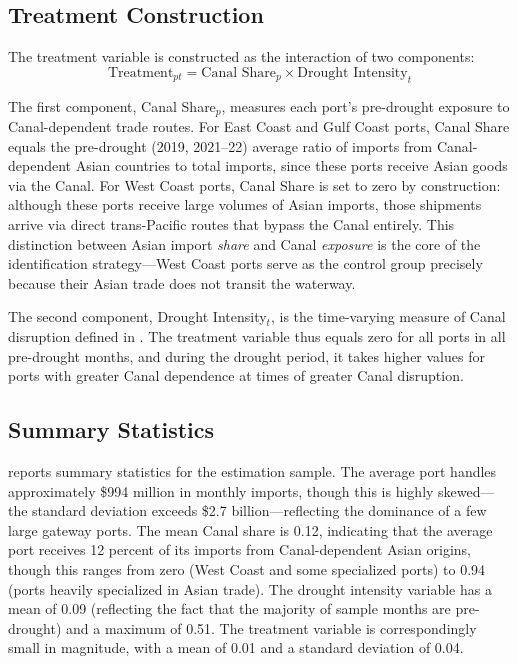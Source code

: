 \documentclass[12pt]{article}
\begin{document}
\subsection{Treatment Construction}

The treatment variable is constructed as the interaction of two components:
\begin{equation}
    \text{Treatment}_{pt} = \text{Canal Share}_p \times \text{Drought Intensity}_t
\label{eq:treatment}
\end{equation}

The first component, Canal Share$_p$, measures each port's pre-drought exposure to Canal-dependent trade routes. For East Coast and Gulf Coast ports, Canal Share equals the pre-drought (2019, 2021--22) average ratio of imports from Canal-dependent Asian countries to total imports, since these ports receive Asian goods via the Canal. For West Coast ports, Canal Share is set to zero by construction: although these ports receive large volumes of Asian imports, those shipments arrive via direct trans-Pacific routes that bypass the Canal entirely. This distinction between Asian import \textit{share} and Canal \textit{exposure} is the core of the identification strategy---West Coast ports serve as the control group precisely because their Asian trade does not transit the waterway.

The second component, Drought Intensity$_t$, is the time-varying measure of Canal disruption defined in . The treatment variable thus equals zero for all ports in all pre-drought months, and during the drought period, it takes higher values for ports with greater Canal dependence at times of greater Canal disruption.

\subsection{Summary Statistics}

 reports summary statistics for the estimation sample. The average port handles approximately \$994 million in monthly imports, though this is highly skewed---the standard deviation exceeds \$2.7 billion---reflecting the dominance of a few large gateway ports. The mean Canal share is 0.12, indicating that the average port receives 12 percent of its imports from Canal-dependent Asian origins, though this ranges from zero (West Coast and some specialized ports) to 0.94 (ports heavily specialized in Asian trade). The drought intensity variable has a mean of 0.09 (reflecting the fact that the majority of sample months are pre-drought) and a maximum of 0.51. The treatment variable is correspondingly small in magnitude, with a mean of 0.01 and a standard deviation of 0.04.
\end{document}
